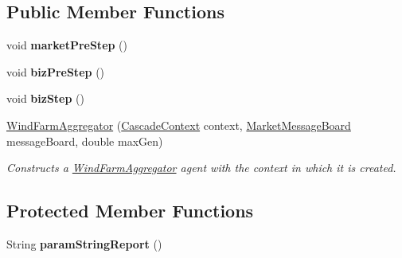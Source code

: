\subsection*{Public Member Functions}
\begin{DoxyCompactItemize}
\item 
\hypertarget{classuk_1_1ac_1_1dmu_1_1iesd_1_1cascade_1_1agents_1_1aggregators_1_1_wind_farm_aggregator_ad9e4ee082cfba104bd0858324ece0686}{void {\bfseries market\-Pre\-Step} ()}\label{classuk_1_1ac_1_1dmu_1_1iesd_1_1cascade_1_1agents_1_1aggregators_1_1_wind_farm_aggregator_ad9e4ee082cfba104bd0858324ece0686}

\item 
\hypertarget{classuk_1_1ac_1_1dmu_1_1iesd_1_1cascade_1_1agents_1_1aggregators_1_1_wind_farm_aggregator_afa6c2634a15a2ad77fe4c042b30130b0}{void {\bfseries biz\-Pre\-Step} ()}\label{classuk_1_1ac_1_1dmu_1_1iesd_1_1cascade_1_1agents_1_1aggregators_1_1_wind_farm_aggregator_afa6c2634a15a2ad77fe4c042b30130b0}

\item 
\hypertarget{classuk_1_1ac_1_1dmu_1_1iesd_1_1cascade_1_1agents_1_1aggregators_1_1_wind_farm_aggregator_a0be3586496a404e6ea2dc1e2820b53ce}{void {\bfseries biz\-Step} ()}\label{classuk_1_1ac_1_1dmu_1_1iesd_1_1cascade_1_1agents_1_1aggregators_1_1_wind_farm_aggregator_a0be3586496a404e6ea2dc1e2820b53ce}

\item 
\hyperlink{classuk_1_1ac_1_1dmu_1_1iesd_1_1cascade_1_1agents_1_1aggregators_1_1_wind_farm_aggregator_a239a9c6de50a58383b4ce652ab7f0f31}{Wind\-Farm\-Aggregator} (\hyperlink{classuk_1_1ac_1_1dmu_1_1iesd_1_1cascade_1_1context_1_1_cascade_context}{Cascade\-Context} context, \hyperlink{classuk_1_1ac_1_1dmu_1_1iesd_1_1cascade_1_1market_1_1astem_1_1operators_1_1_market_message_board}{Market\-Message\-Board} message\-Board, double max\-Gen)
\begin{DoxyCompactList}\small\item\em Constructs a \hyperlink{classuk_1_1ac_1_1dmu_1_1iesd_1_1cascade_1_1agents_1_1aggregators_1_1_wind_farm_aggregator}{Wind\-Farm\-Aggregator} agent with the context in which it is created. \end{DoxyCompactList}\end{DoxyCompactItemize}
\subsection*{Protected Member Functions}
\begin{DoxyCompactItemize}
\item 
\hypertarget{classuk_1_1ac_1_1dmu_1_1iesd_1_1cascade_1_1agents_1_1aggregators_1_1_wind_farm_aggregator_a9559c41e6de5ce4e0b237995a42a1bab}{String {\bfseries param\-String\-Report} ()}\label{classuk_1_1ac_1_1dmu_1_1iesd_1_1cascade_1_1agents_1_1aggregators_1_1_wind_farm_aggregator_a9559c41e6de5ce4e0b237995a42a1bab}

\end{DoxyCompactItemize}
